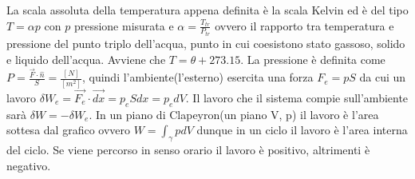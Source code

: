 \documentclass{article}
\begin{document}
La scala assoluta della temperatura appena definita è la scala Kelvin ed è del tipo $T=\alpha p$ con $p$ pressione misurata e $\alpha=\frac{T_{tr}}{P _{tr}}$ ovvero il rapporto tra temperatura e pressione del punto triplo dell'acqua, punto in cui coesistono stato gassoso, solido e liquido dell'acqua. Avviene che $T=\theta+273.15$.
La pressione è definita come $P=\frac{{\vec{F} \cdot \hat{n}}}{S}=\frac{[N]}{[m^2]}$, quindi l'ambiente(l'esterno) esercita una forza $F_e=pS$ da cui un lavoro $\delta W_e=\vec{F_e}\cdot \vec{dx}=p_e Sdx=p_e dV$. Il lavoro che il sistema compie sull'ambiente sarà $\delta W=-\delta W_e$. In un piano di Clapeyron(un piano V, p) il lavoro è l'area sottesa dal grafico ovvero $W=\int_{\gamma}pdV$ dunque in un ciclo il lavoro è l'area interna del ciclo. Se viene percorso in senso orario il lavoro è positivo, altrimenti è negativo.
\end{document}
